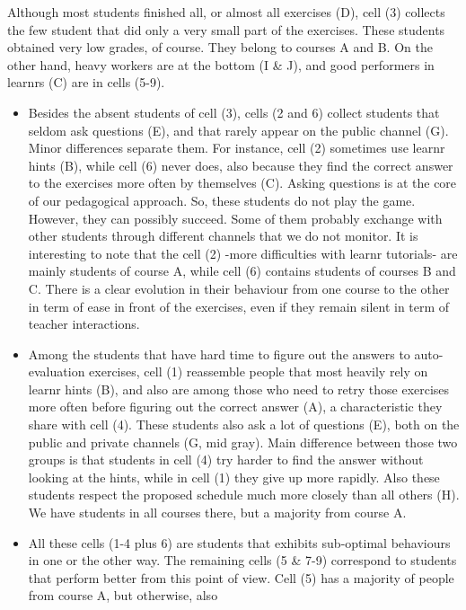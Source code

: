 \documentclass[
]{article}
\begin{document}
Although most students finished all, or almost all exercises (D), cell
(3) collects the few student that did only a very small part of the
exercises. These students obtained very low grades, of course. They
belong to courses A and B. On the other hand, heavy workers are at the
bottom (I \& J), and good performers in learnrs (C) are in cells (5-9).

\begin{itemize}
\item
  Besides the absent students of cell (3), cells (2 and 6) collect
  students that seldom ask questions (E), and that rarely appear on the
  public channel (G). Minor differences separate them. For instance,
  cell (2) sometimes use learnr hints (B), while cell (6) never does,
  also because they find the correct answer to the exercises more often
  by themselves (C). Asking questions is at the core of our pedagogical
  approach. So, these students do not play the game. However, they can
  possibly succeed. Some of them probably exchange with other students
  through different channels that we do not monitor. It is interesting
  to note that the cell (2) -more difficulties with learnr tutorials-
  are mainly students of course A, while cell (6) contains students of
  courses B and C. There is a clear evolution in their behaviour from
  one course to the other in term of ease in front of the exercises,
  even if they remain silent in term of teacher interactions.
\item
  Among the students that have hard time to figure out the answers to
  auto-evaluation exercises, cell (1) reassemble people that most
  heavily rely on learnr hints (B), and also are among those who need to
  retry those exercises more often before figuring out the correct
  answer (A), a characteristic they share with cell (4). These students
  also ask a lot of questions (E), both on the public and private
  channels (G, mid gray). Main difference between those two groups is
  that students in cell (4) try harder to find the answer without
  looking at the hints, while in cell (1) they give up more rapidly.
  Also these students respect the proposed schedule much more closely
  than all others (H). We have students in all courses there, but a
  majority from course A.
\item
  All these cells (1-4 plus 6) are students that exhibits sub-optimal
  behaviours in one or the other way. The remaining cells (5 \& 7-9)
  correspond to students that perform better from this point of view.
  Cell (5) has a majority of people from course A, but otherwise, also

\end{itemize}
\end{document}
